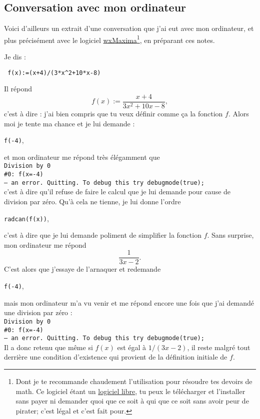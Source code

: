 \subsection{Conversation avec mon ordinateur}

Voici d'ailleurs un extrait d'une conversation que j'ai eut avec mon ordinateur, et plus précisément avec le logiciel \href{http://fr.wikipedia.org/wiki/Maxima}{wxMaxima}\footnote{Dont je te recommande chaudement l'utilisation pour résoudre tes devoirs de math. Ce logiciel étant un \href{http://fr.wikipedia.org/wiki/Logiciel_libre}{logiciel libre}, tu peux le télécharger et l'installer sans payer ni demander quoi que ce soit à qui que ce soit sans avoir peur de pirater; c'est légal et c'est fait pour.}, en préparant ces notes.

Je dis :
\begin{center}
\texttt{ f(x)\!:=(x+4)/(3*x\textasciicircum 2+10*x-8)}
\end{center}
Il répond
\begin{equation}		\label{EqOrdiRefuse}
  f(x):= \frac{ x+4 }{ 3x^2+10x-8 },
\end{equation}
c'est à dire : \og j'ai bien compris que tu veux définir comme ça la fonction $f$\fg. Alors moi je tente ma chance et je lui demande :
\begin{center}
\texttt{f(-4)},
\end{center}
et mon ordinateur me répond très élégamment que\\
\texttt{Division by 0\\ \#0: f(x=-4)\\-- an error. Quitting. To debug this try debugmode(true);\\}
c'est à dire qu'il refuse de faire le calcul que je lui demande pour cause de division par zéro. Qu'à cela ne tienne, je lui donne l'ordre
\begin{center}
\texttt{radcan(f(x))},
\end{center}
 c'est à dire que je lui demande poliment de simplifier la fonction $f$. Sans surprise, mon ordinateur me répond
\[ 
  \frac{ 1 }{ 3x-2 }.
\]
C'est alors que j'essaye de l'arnaquer et redemande
\begin{center}
\texttt{f(-4)},
\end{center}
mais mon ordinateur m'a vu venir et me répond encore une fois que j'ai demandé une division par zéro :\\
\texttt{Division by 0\\ \#0: f(x=-4)\\-- an error. Quitting. To debug this try debugmode(true);\\}
Il a donc retenu que même si $f(x)$ est égal à $1/(3x-2)$, il reste malgré tout derrière une condition d'existence qui provient de la définition initiale de $f$.

